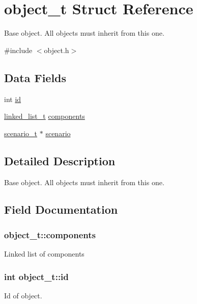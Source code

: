 \hypertarget{structobject__t}{}\section{object\+\_\+t Struct Reference}
\label{structobject__t}


Base object. All objects must inherit from this one.  




{\ttfamily \#include $<$object.\+h$>$}

\subsection*{Data Fields}
\begin{DoxyCompactItemize}
\item 
int \hyperlink{structobject__t_a9f34931fd2aceef966c6fa3230a8c5db}{id}
\item 
\hyperlink{structlinked__list__t}{linked\+\_\+list\+\_\+t} \hyperlink{structobject__t_a8e5efa8b7b5a6772f372efba300a9c01}{components}
\item 
\hyperlink{structscenario__t}{scenario\+\_\+t} $\ast$ \hyperlink{structobject__t_aa3f8f0db477d6396b00d03b204c07329}{scenario}
\end{DoxyCompactItemize}


\subsection{Detailed Description}
Base object. All objects must inherit from this one. 

\subsection{Field Documentation}
\subsubsection[{\texorpdfstring{components}{components}}]{ object\+\_\+t\+::components}\hypertarget{structobject__t_a8e5efa8b7b5a6772f372efba300a9c01}{}\label{structobject__t_a8e5efa8b7b5a6772f372efba300a9c01}
Linked list of components 
\subsubsection[{\texorpdfstring{id}{id}}]{\setlength{\rightskip}{0pt plus 5cm}int object\+\_\+t\+::id}\hypertarget{structobject__t_a9f34931fd2aceef966c6fa3230a8c5db}{}\label{structobject__t_a9f34931fd2aceef966c6fa3230a8c5db}
Id of object. 
